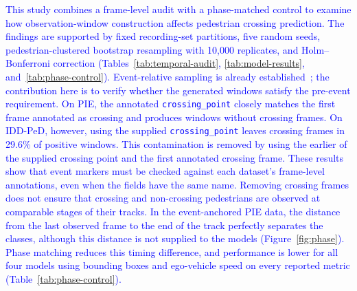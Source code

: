 \documentclass[mti,article,submit,moreauthors]{Definitions/mdpi}
\begin{document}
\textcolor{blue}{This study combines a frame-level audit with a phase-matched control to examine how observation-window construction affects pedestrian crossing prediction. The findings are supported by fixed recording-set partitions, five random seeds, pedestrian-clustered bootstrap resampling with 10,000 replicates, and Holm--Bonferroni correction (Tables~\ref{tab:temporal-audit}, \ref{tab:model-results}, and~\ref{tab:phase-control}). Event-relative sampling is already established~\citep{kotseruba2021benchmark}; the contribution here is to verify whether the generated windows satisfy the pre-event requirement. On PIE, the annotated \texttt{crossing\_point} closely matches the first frame annotated as crossing and produces windows without crossing frames. On IDD-PeD, however, using the supplied \texttt{crossing\_point} leaves crossing frames in 29.6\% of positive windows. This contamination is removed by using the earlier of the supplied crossing point and the first annotated crossing frame. These results show that event markers must be checked against each dataset's frame-level annotations, even when the fields have the same name. Removing crossing frames does not ensure that crossing and non-crossing pedestrians are observed at comparable stages of their tracks. In the event-anchored PIE data, the distance from the last observed frame to the end of the track perfectly separates the classes, although this distance is not supplied to the models (Figure~\ref{fig:phase}). Phase matching reduces this timing difference, and performance is lower for all four models using bounding boxes and ego-vehicle speed on every reported metric (Table~\ref{tab:phase-control}).}
\end{document}
